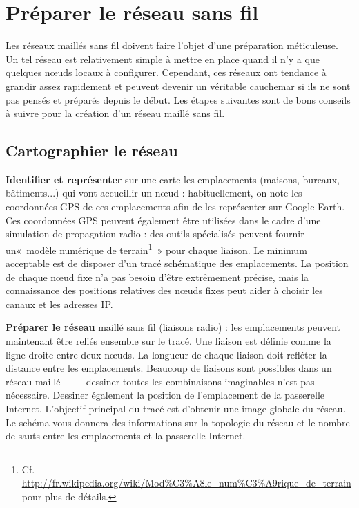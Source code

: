 \documentclass[a4paper,french,11pt,twoside]{article}
\begin{document}
\section{Préparer le réseau sans fil}

Les réseaux maillés sans fil doivent faire l'objet d'une préparation méticuleuse. Un tel réseau est relativement simple à mettre en place quand il n'y a que quelques nœuds locaux à configurer. Cependant, ces réseaux ont tendance à grandir assez rapidement et peuvent devenir un véritable cauchemar si ils ne sont pas pensés et préparés depuis le début. Les étapes suivantes sont de bons conseils à suivre pour la création d'un réseau maillé sans fil.

\subsection{Cartographier le réseau}

\textbf{Identifier et représenter} sur une carte les emplacements (maisons, bureaux, bâtiments...) qui vont accueillir un nœud : habituellement, on note les coordonnées GPS de ces emplacements afin de les représenter sur Google Earth. Ces coordonnées GPS peuvent également être utilisées dans le cadre d'une simulation de propagation radio : des outils spécialisés peuvent fournir un«~modèle numérique de terrain\footnote{Cf. \url{http://fr.wikipedia.org/wiki/Mod\%C3\%A8le\_num\%C3\%A9rique\_de\_terrain} pour plus de détails.}~» pour chaque liaison. Le minimum acceptable est de disposer d'un tracé schématique des emplacements. La position de chaque nœud fixe n'a pas besoin d'être extrêmement précise, mais la connaissance des positions relatives des nœuds fixes peut aider à choisir les canaux et les adresses IP.

\medskip
\textbf{Préparer le réseau} maillé sans fil (liaisons radio) : les emplacements peuvent maintenant être reliés ensemble sur le tracé. Une liaison est définie comme la ligne droite entre deux nœuds. La longueur de chaque liaison doit refléter la distance entre les emplacements. Beaucoup de liaisons sont possibles dans un réseau maillé ~---~ dessiner toutes les combinaisons imaginables n'est pas nécessaire. Dessiner également la position de l'emplacement de la passerelle Internet. L'objectif principal du tracé est d'obtenir une image globale du réseau. Le schéma vous donnera des informations sur la topologie du réseau et le nombre de sauts entre les emplacements et la passerelle Internet.
\end{document}
